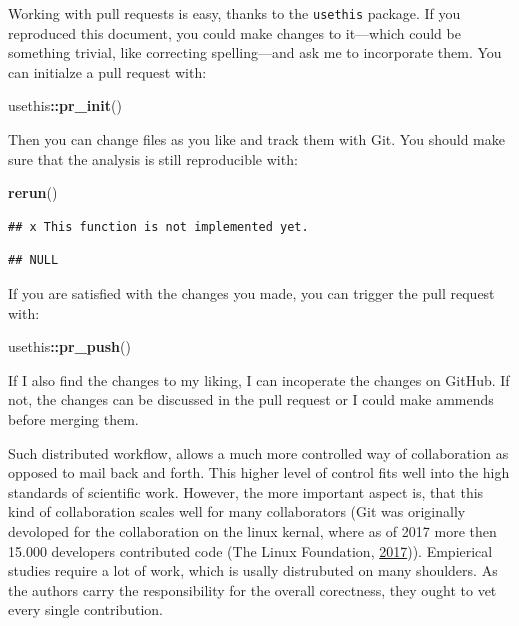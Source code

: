 \documentclass[12pt,a4paper,]{article}
\newenvironment{Shaded}{\begin{snugshade}}{\end{snugshade}}
\newcommand{\KeywordTok}[1]{\textcolor[rgb]{0.13,0.29,0.53}{\textbf{#1}}}
\newcommand{\NormalTok}[1]{#1}
\newcommand{\OperatorTok}[1]{\textcolor[rgb]{0.81,0.36,0.00}{\textbf{#1}}}
\begin{document}
Working with pull requests is easy, thanks to the \texttt{usethis} package.
If you reproduced this document, you could make changes to it---which could be something trivial, like correcting spelling---and ask me to incorporate them.
You can initialze a pull request with:

\begin{Shaded}
\begin{Highlighting}[]
\NormalTok{usethis}\OperatorTok{::}\KeywordTok{pr_init}\NormalTok{()}
\end{Highlighting}
\end{Shaded}

Then you can change files as you like and track them with Git.
You should make sure that the analysis is still reproducible with:

\begin{Shaded}
\begin{Highlighting}[]
\KeywordTok{rerun}\NormalTok{()}
\end{Highlighting}
\end{Shaded}

\begin{verbatim}
## x This function is not implemented yet.
\end{verbatim}

\begin{verbatim}
## NULL
\end{verbatim}

If you are satisfied with the changes you made, you can trigger the pull request with:

\begin{Shaded}
\begin{Highlighting}[]
\NormalTok{usethis}\OperatorTok{::}\KeywordTok{pr_push}\NormalTok{()}
\end{Highlighting}
\end{Shaded}

If I also find the changes to my liking, I can incoperate the changes on GitHub. If not, the changes can be discussed in the pull request or I could make ammends before merging them.

Such distributed workflow, allows a much more controlled way of collaboration as opposed to mail back and forth.
This higher level of control fits well into the high standards of scientific work.
However, the more important aspect is, that this kind of collaboration scales well for many collaborators (Git was originally devoloped for the collaboration on the linux kernal, where as of 2017 more then 15.000 developers contributed code (The Linux Foundation, \protect\hyperlink{ref-thelinuxfoundation2017LinuxKernel2017}{2017})).
Empierical studies require a lot of work, which is usally distrubuted on many shoulders.
As the authors carry the responsibility for the overall corectness, they ought to vet every single contribution.
\end{document}
